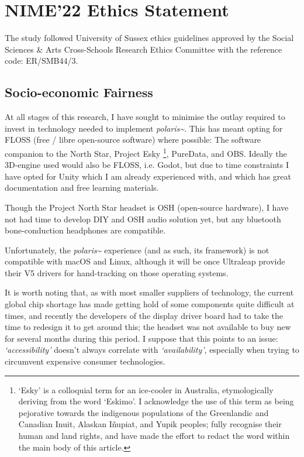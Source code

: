 \section{NIME'22 Ethics Statement}\label{sec: polaris-ethics}
The study followed University of Sussex ethics guidelines approved by the Social Sciences \& Arts Cross-Schools Research Ethics Committee with the reference code: ER/SMB44/3.

\subsection{Socio-economic Fairness}\label{sec: polaris-ethics-}
At all stages of this research, I have sought to minimise the outlay required to invest in technology needed to implement \textit{polaris\textasciitilde{}}. This has meant opting for FLOSS (free / libre open-source software) where possible: The software companion to the North Star, Project Esky \footnote{`Esky' is a colloquial term for an ice-cooler in Australia, etymologically deriving from the word `Eskimo'. I acknowledge the use of this term as being pejorative towards the indigenous populations of the Greenlandic and Canadian Inuit, Alaskan Iñupiat, and Yupik peoples; fully recognise their human and land rights, and have made the effort to redact the word within the main body of this article.}, PureData, and OBS. Ideally the 3D-engine used would also be FLOSS, i.e. Godot, but due to time constraints I have opted for Unity which I am already experienced with, and which has great documentation and free learning materials.

Though the Project North Star headset is OSH (open-source hardware), I have not had time to develop DIY and OSH audio solution yet, but any bluetooth bone-conduction headphones are compatible.

Unfortunately, the \textit{polaris\textasciitilde{}} experience (and as such, its framework) is not compatible with macOS and Linux, although it will be once Ultraleap provide their V5 drivers for hand-tracking on those operating systems.

It is worth noting that, as with most smaller suppliers of technology, the current global chip shortage has made getting hold of some components quite difficult at times, and recently the developers of the display driver board had to take the time to redesign it to get around this; the headset was not available to buy new for several months during this period. I suppose that this points to an issue: \textit{`accessibility'} doesn't always correlate with \textit{`availability'}, especially when trying to circumvent expensive consumer technologies.

